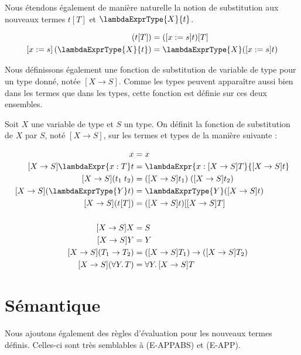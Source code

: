 Nous étendons également de manière naturelle la notion de substitution aux
nouveaux termes $t[T]$ et $\lambdaExprType{X}{t}$.

\begin{align*}
  [x := s] \, (t[T]) & = ([x := s]t)[T] \\
  [x := s] \, (\lambdaExprType{X}{t}) & = \lambdaExprType{X}([x := s]t)
\end{align*}

Nous définissons également une fonction de substitution de variable de type pour
un type donné, notée $[X \rightarrow S]$. Comme les types peuvent apparaître
aussi bien dans les termes que dans les types, cette fonction est définie sur
ces deux ensembles.

\begin{definition}
  Soit $X$ une variable de type et $S$ un type. On définit la fonction de
  substitution de $X$ par $S$, noté $[X \rightarrow S]$, sur les termes et types
  de la manière suivante :

  \begin{align*}
    [X \rightarrow S]x & = x \\
    [X \rightarrow S]\lambdaExpr{x : T} t & = \lambdaExpr{x : [X \rightarrow S]T}{[X \rightarrow S]t} \\
    [X \rightarrow S](t_{1} \; t_{2}) & = ([X \rightarrow S]t_{1}) \; ([X \rightarrow S]t_{2}) \\
    [X \rightarrow S](\lambdaExprType{Y} t) & = \lambdaExprType{Y}([X \rightarrow S] t) \\
    [X \rightarrow S](t[T]) & = ([X \rightarrow S] t)[[X \rightarrow S] T] \\
    \\
    [X \rightarrow S]X & = S \\
    [X \rightarrow S]Y & = Y \\
    [X \rightarrow S](T_{1} \rightarrow T_{2}) & = ([X \rightarrow S]T_{1}) \rightarrow ([X \rightarrow S] T_{2}) \\
    [X \rightarrow S](\forall Y .\, T) & = \forall Y . \, [X \rightarrow S]T
  \end{align*}
\end{definition}
\section{Sémantique}

Nous ajoutons également des règles d'évaluation pour les nouveaux termes
définis. Celles-ci sont très semblables à (E-APPABS) et (E-APP).

